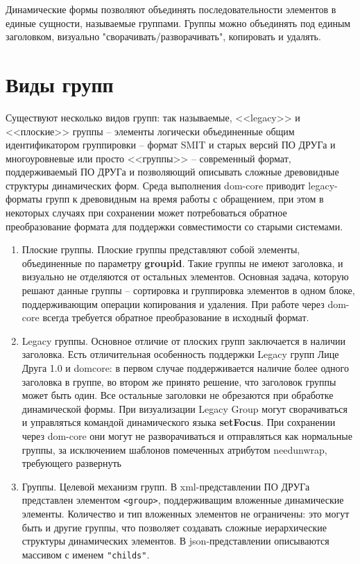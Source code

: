 \documentclass[../index.tex]{subfiles}
\begin{document}
    Динамические формы позволяют объединять последовательности элементов в единые сущности, называемые группами. Группы можно объединять под единым заголовком, визуально "сворачивать/разворачивать", копировать и удалять.

\section{Виды групп}
        Существуют несколько видов групп: так называемые, <<legacy>> и <<плоские>> группы -- элементы логически объединенные общим идентификатором группировки -- формат SMIT и старых версий  ПО ДРУГа и многоуровневые или просто <<группы>> -- современный формат, поддерживаемый ПО ДРУГа и позволяющий описывать сложные древовидные структуры динамических форм. Среда выполнения dom-core
        приводит legacy-форматы групп к древовидным на время работы с обращением, при этом в некоторых случаях при сохранении может потребоваться обратное преобразование формата для поддержки совместимости со старыми системами.
\begin{enumerate}
    \item Плоские группы. Плоские группы представляют собой элементы, объединенные по параметру \textbf{groupid}. Такие группы не имеют заголовка, и визуально не отделяются от остальных элементов. Основная задача, которую решают данные группы -- сортировка и группировка элементов в одном блоке, поддерживающим операции копирования и удаления. При работе через dom-core всегда требуется обратное преобразование в исходный формат.
    \item Legacy группы. Основное отличие от плоских групп заключается в наличии заголовка. Есть отличительная особенность поддержки Legacy групп Лице Друга 1.0 и domcore: в первом случае поддерживается наличие более одного заголовка в группе, во втором же принято решение, что заголовок группы может быть один. Все остальные заголовки не обрезаются при обработке динамической формы. При визуализации Legacy Group могут сворачиваться и управляться командой динамического языка \textbf{setFocus}. При сохранении через dom-core они могут не разворачиваться и отправляться как нормальные группы, за исключением шаблонов помеченных атрибутом needunwrap, требующего развернуть
    \item Группы. Целевой механизм групп. В xml-представлении ПО ДРУГа представлен элементом \verb|<group>|, поддерживащим вложенные
    динамические элементы. Количество и тип вложенных элементов не ограничены: это могут быть и другие группы, что позволяет создавать сложные иерархические структуры динамических элементов. В json-представлении описываются массивом с именем \verb|"childs"|.
\end{enumerate}
\end{document}
